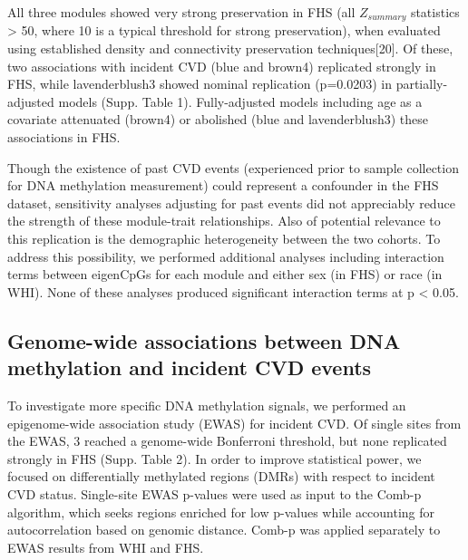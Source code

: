 \documentclass[]{article}
\theoremstyle{definition}
\theoremstyle{definition}
\theoremstyle{definition}
\theoremstyle{remark}
\begin{document}
All three modules showed very strong preservation in FHS (all
\(Z_{summary}\) statistics \textgreater{} 50, where 10 is a typical
threshold for strong preservation), when evaluated using established
density and connectivity preservation techniques{[}20{]}. Of these, two
associations with incident CVD (blue and brown4) replicated strongly in
FHS, while lavenderblush3 showed nominal replication (p=0.0203) in
partially-adjusted models (Supp. Table 1). Fully-adjusted models
including age as a covariate attenuated (brown4) or abolished (blue and
lavenderblush3) these associations in FHS.

Though the existence of past CVD events (experienced prior to sample
collection for DNA methylation measurement) could represent a confounder
in the FHS dataset, sensitivity analyses adjusting for past events did
not appreciably reduce the strength of these module-trait relationships.
Also of potential relevance to this replication is the demographic
heterogeneity between the two cohorts. To address this possibility, we
performed additional analyses including interaction terms between
eigenCpGs for each module and either sex (in FHS) or race (in WHI). None
of these analyses produced significant interaction terms at p
\textless{} 0.05.

\subsection{Genome-wide associations between DNA methylation and
incident CVD
events}\label{genome-wide-associations-between-dna-methylation-and-incident-cvd-events}

To investigate more specific DNA methylation signals, we performed an
epigenome-wide association study (EWAS) for incident CVD. Of single
sites from the EWAS, 3 reached a genome-wide Bonferroni threshold, but
none replicated strongly in FHS (Supp. Table 2). In order to improve
statistical power, we focused on differentially methylated regions
(DMRs) with respect to incident CVD status. Single-site EWAS p-values
were used as input to the Comb-p algorithm, which seeks regions enriched
for low p-values while accounting for autocorrelation based on genomic
distance. Comb-p was applied separately to EWAS results from WHI and
FHS.
\end{document}
